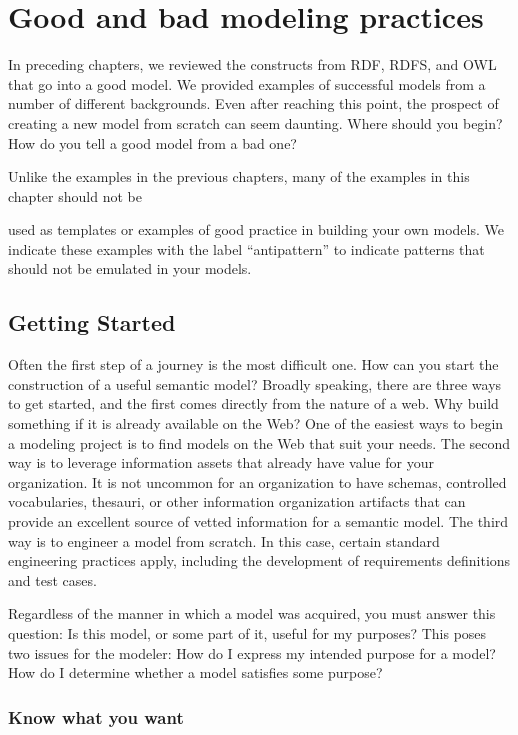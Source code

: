 \chapter{Good and bad modeling practices}
\label {ch15}

In preceding chapters, we reviewed the constructs from RDF, RDFS, and
OWL that go into a good model. We provided examples of successful models
from a number of different backgrounds. Even after reaching this point,
the prospect of creating a new model from scratch can seem daunting.
Where should you begin? How do you tell a good model from a bad one?

Unlike the examples in the previous chapters, many of the examples in
this chapter should not be

used as templates or examples of good practice in building your own
models. We indicate these examples with the label ``antipattern'' to
indicate patterns that should not be emulated in your models.

\section{Getting Started}

Often the first step of a journey is the most difficult one. How can you
start the construction of a useful semantic model? Broadly speaking,
there are three ways to get started, and the first comes directly from
the nature of a web. Why build something if it is already available on
the Web? One of the easiest ways to begin a modeling project is to find
models on the Web that suit your needs. The second way is to leverage
information assets that already have value for your organization.
It is not uncommon for an organization to have schemas, controlled
vocabularies, thesauri, or other information organization artifacts that
can provide an excellent source of vetted information
for a semantic model. The third way is to engineer a model from scratch.
In this case, certain standard engineering practices apply, including
the development of requirements definitions and test cases.

Regardless of the manner in which a model was acquired, you must answer
this question: Is this model, or some part of it, useful for my
purposes? This poses two issues for the modeler: How do I express my
intended purpose for a model? How do I determine whether a model
satisfies some purpose?

\subsection{Know what you want}

